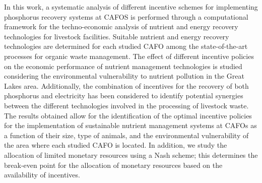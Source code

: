 \begin{refsection}[referencesCh5]
In this work, a systematic analysis of different incentive schemes for implementing phosphorus recovery systems at CAFOS is performed through a computational framework for the techno-economic analysis of nutrient and energy recovery technologies for livestock facilities. Suitable nutrient and energy recovery technologies are determined for each studied CAFO among the state-of-the-art processes for organic waste management. The effect of different incentive policies on the economic performance of nutrient management technologies is studied considering the environmental vulnerability to nutrient pollution in the Great Lakes area. Additionally, the combination of incentives for the recovery of both phosphorus and electricity has been considered to identify potential synergies between the different technologies involved in the processing of livestock waste. The results obtained allow for the identification of the optimal incentive policies for the implementation of sustainable nutrient management systems at CAFOs as a function of their size, type of animals, and the environmental vulnerability of the area where each studied CAFO is located. In addition, we study the allocation of limited monetary resources  using a Nash scheme; this determines the break-even point for the allocation of monetary resources based on the availability of incentives.


\end{refsection}
